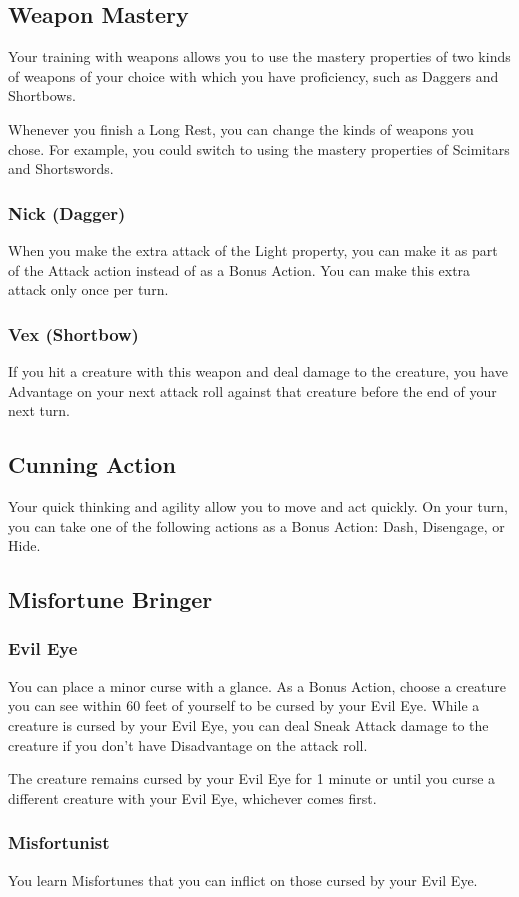 \documentclass[letterpaper,openany,oneside,twocolumn]{book}
\begin{document}
\subsection*{Weapon Mastery}
Your training with weapons allows you to use the mastery properties of two kinds of weapons of your choice with which you have proficiency, such as Daggers and Shortbows.

Whenever you finish a Long Rest, you can change the kinds of weapons you chose. For example, you could switch to using the mastery properties of Scimitars and Shortswords.
\subsubsection*{Nick (Dagger)}
When you make the extra attack of the Light property, you can make it as part of the Attack action instead of as a Bonus Action. You can make this extra attack only once per turn.
\subsubsection*{Vex (Shortbow)}
If you hit a creature with this weapon and deal damage to the creature, you have Advantage on your next attack roll against that creature before the end of your next turn.
\subsection*{Cunning Action}
Your quick thinking and agility allow you to move and act quickly. On your turn, you can take one of the following actions as a Bonus Action: Dash, Disengage, or Hide.
\subsection*{Misfortune Bringer}
\subsubsection*{Evil Eye}
You can place a minor curse with a glance. As a Bonus Action, choose a creature you can see within 60 feet of yourself to be cursed by your Evil Eye. While a creature is cursed by your Evil Eye, you can deal Sneak Attack damage to the creature if you don't have Disadvantage on the attack roll.

The creature remains cursed by your Evil Eye for 1 minute or until you curse a different creature with your Evil Eye, whichever comes first.
\subsubsection*{Misfortunist}
You learn Misfortunes that you can inflict on those cursed by your Evil Eye.
\end{document}

